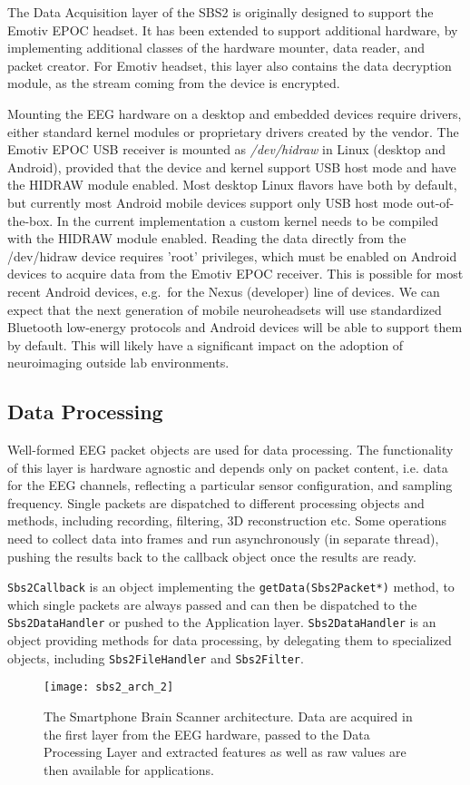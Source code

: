 \documentclass[10pt]{article}
\begin{document}
The Data Acquisition layer of the SBS2 is originally designed to support the Emotiv EPOC headset. It has been extended to support additional hardware, by implementing additional classes of the hardware mounter, data reader, and packet creator. For Emotiv headset, this layer also contains the data decryption module, as the stream coming from the device is encrypted.

Mounting the EEG hardware on a desktop and embedded devices require drivers, either standard kernel modules or proprietary drivers created by the vendor. The Emotiv EPOC USB receiver is mounted as \emph{/dev/hidraw} in Linux (desktop and Android), provided that the device and kernel support USB host mode and have the HIDRAW module enabled. Most desktop Linux flavors have both by default, but currently most Android mobile devices support only USB host mode out-of-the-box. In the current implementation a custom kernel needs to be compiled with the HIDRAW module enabled. Reading the data directly from the /dev/hidraw device requires 'root' privileges, which must be enabled on Android devices to acquire data from the Emotiv EPOC receiver. This is possible for most recent Android devices, e.g.~for the Nexus (developer) line of devices. We can expect that the next generation of mobile neuroheadsets will use standardized Bluetooth low-energy protocols and Android devices will be able to support them by default. This will likely have a significant impact on the adoption of neuroimaging outside lab environments.

	\subsection{Data Processing}
Well-formed EEG packet objects are used for data processing. The functionality of this layer is hardware agnostic and depends only on packet content, i.e. data for the EEG channels, reflecting a particular sensor configuration, and sampling frequency. Single packets are dispatched to different processing objects and methods, including recording, filtering, 3D reconstruction etc. Some operations need to collect data into frames and run asynchronously (in separate thread), pushing the results back to the callback object once the results are ready.

{\tt Sbs2Callback} is an object implementing the {\tt getData(Sbs2Packet*)} method, to which  single packets are always passed and can then be dispatched to the {\tt Sbs2DataHandler} or pushed to the Application layer. {\tt Sbs2DataHandler} is an object providing methods for data processing, by delegating them to specialized objects, including {\tt Sbs2FileHandler} and {\tt Sbs2Filter}.
\begin{figure}[!t]
\centering
\texttt{[image: sbs2\_arch\_2]}
\caption{The Smartphone Brain Scanner architecture. Data are acquired in the first layer from the EEG hardware, passed to the Data Processing Layer and extracted features as well as raw values are then available for applications.}
\label{sbs2_arch_2}
\end{figure}
\end{document}
